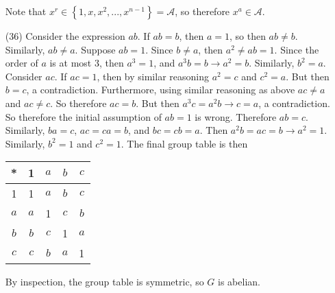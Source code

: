 \documentclass[12pt]{article}
\begin{document}
\begin{itemize}
Note that $x^r \in \left\lbrace 1, x, x^2, ..., x^{n - 1} \right\rbrace = \mathcal{A}$, so therefore $x^a \in \mathcal{A}$.
\item[(36)]
Consider the expression $ab$. If $ab = b$, then $a = 1$, so then $ab \neq b$. Similarly, $ab \neq a$. Suppose $ab = 1$. Since $b \neq a$, then $a^2 \neq ab = 1$. Since the order of $a$ is at most 3, then $a^3 = 1$, and $a^3b = b \rightarrow a^2 = b$. Similarly, $b^2 = a$. Consider $ac$. If $ac = 1$, then by similar reasoning $a^2 = c$ and $c^2 = a$. But then $b = c$, a contradiction. Furthermore, using similar reasoning as above $ac \neq a$ and $ac \neq c$. So therefore $ac = b$. But then $a^3c = a^2b \rightarrow c = a$, a contradiction. So therefore the initial assumption of $ab = 1$ is wrong. Therefore $ab = c$. Similarly, $ba = c$, $ac = ca = b$, and $bc = cb = a$. Then $a^2b = ac = b \rightarrow a^2 = 1$. Similarly, $b^2 = 1$ and $c^2 = 1$. The final group table is then \\
\begin{center}
\begin{tabular}{| c || c | c | c | c |}
\hline
* & 1 & $a$ & $b$ & $c$ \\
\hline
\hline
1 & 1 & $a$ & $b$ & $c$ \\
\hline
$a$ & $a$ & 1 & $c$ & $b$ \\
\hline
$b$ & $b$ & $c$ & 1 & $a$ \\
\hline
$c$ & $c$ & $b$ & $a$ & 1 \\
\hline
\end{tabular}
\end{center}
By inspection, the group table is symmetric, so $G$ is abelian.
\end{itemize}
\end{document}
